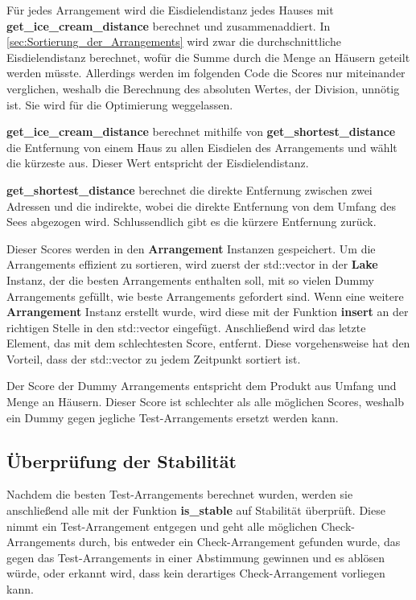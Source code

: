 \documentclass[a4paper,10pt,ngerman,captions=figureheading]{scrartcl}
\begin{document}
Für jedes Arrangement wird die Eisdielendistanz jedes Hauses mit \textbf{get\_ice\_cream\_distance} berechnet und zusammenaddiert.
In \autoref{sec:Sortierung_der_Arrangements} wird zwar die durchschnittliche Eisdielendistanz berechnet, wofür die Summe durch die Menge an Häusern geteilt werden müsste.
Allerdings werden im folgenden Code die Scores nur miteinander verglichen, weshalb die Berechnung des absoluten Wertes, der Division, unnötig ist.
Sie wird für die Optimierung weggelassen.

\medskip
\begin{addmargin}[3em]{4em}
    \textbf{get\_ice\_cream\_distance} berechnet mithilfe von \textbf{get\_shortest\_distance} die Entfernung von einem Haus zu allen Eisdielen des Arrangements und wählt die kürzeste aus.
    Dieser Wert entspricht der Eisdielendistanz.
\end{addmargin}

\medskip
\begin{addmargin}[3em]{4em}
    \textbf{get\_shortest\_distance} berechnet die direkte Entfernung zwischen zwei Adressen und die indirekte, wobei die direkte Entfernung von dem Umfang des Sees abgezogen wird.
    Schlussendlich gibt es die kürzere Entfernung zurück.
\end{addmargin}

\medskip
Dieser Scores werden in den \textbf{Arrangement} Instanzen gespeichert.
Um die Arrangements effizient zu sortieren, wird zuerst der std::vector in der \textbf{Lake} Instanz, der die besten Arrangements enthalten soll, mit so vielen Dummy Arrangements gefüllt, wie beste Arrangements gefordert sind.
Wenn eine weitere \textbf{Arrangement} Instanz erstellt wurde, wird diese mit der Funktion \textbf{insert} an der richtigen Stelle in den std::vector eingefügt.
Anschließend wird das letzte Element, das mit dem schlechtesten Score, entfernt.
Diese vorgehensweise hat den Vorteil, dass der std::vector zu jedem Zeitpunkt sortiert ist.

Der Score der Dummy Arrangements entspricht dem Produkt aus Umfang und Menge an Häusern.
Dieser Score ist schlechter als alle möglichen Scores, weshalb ein Dummy gegen jegliche Test-Arrangements ersetzt werden kann.

\subsection{Überprüfung der Stabilität}
\label{sec:Überprüfung_der_Stabilität}
Nachdem die besten Test-Arrangements berechnet wurden, werden sie anschließend alle mit der Funktion \textbf{is\_stable} auf Stabilität überprüft.
Diese nimmt ein Test-Arrangement entgegen und geht alle möglichen Check-Arrangements durch, bis entweder ein Check-Arrangement gefunden wurde, das gegen das Test-Arrangements in einer Abstimmung gewinnen und es ablösen würde, oder erkannt wird, dass kein derartiges Check-Arrangement vorliegen kann.
\end{document}
